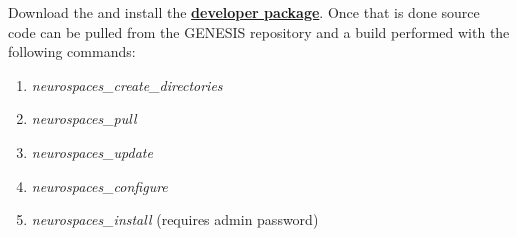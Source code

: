 \documentclass[12pt]{article}
\begin{document}

Download the and install the \href{../../developer-package/developer-package.tex}{\bf developer package}. Once that is done source code can be pulled from the GENESIS repository and a build performed with the following commands:
\begin{enumerate}
   \item{\it neurospaces\_create\_directories}
   \item{\it neurospaces\_pull}
   \item{\it neurospaces\_update}
   \item{\it neurospaces\_configure}
   \item{\it neurospaces\_install} (requires admin password) 
\end{enumerate}



\end{document}
